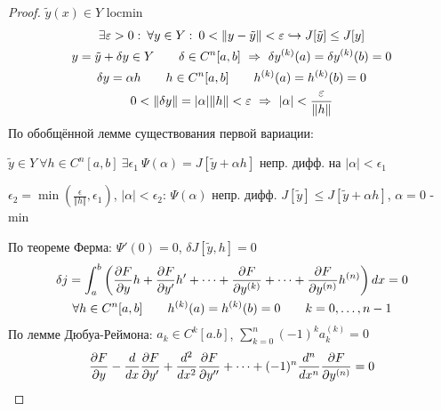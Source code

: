 \documentclass{article}
\begin{document}
\begin{proof}
  $\tilde{y}(x) \in Y$ locmin
  \begin{gather*}
    \exists \epsilon > 0 :\: \forall y \in Y :\: 0 < \Vert y-\tilde{y} \Vert < \epsilon \true J[\tilde{y}] \le J[y] \\ 
    y = \tilde{y} + \delta y \in Y \qquad \delta \in C^{n}[a,b] \ \implies \  \delta y^{(k)}(a)= \delta y^{(k)}(b)=0 \\ 
    \delta y = \alpha h \qquad h \in C^{n}[a,b] \qquad h^{(k)}(a)=h^{(k)}(b)=0 \\ 
    0 < \Vert \delta y \Vert = |\alpha|\Vert h \Vert < \epsilon \ \implies \ |\alpha| < \frac{\epsilon}{\Vert h \Vert}
  \end{gather*}
  По обобщённой лемме существования первой вариации: 

  $\tilde{y}\in Y \ \forall h \in C^{n}[a,b] \ \exists \epsilon_1 \ \Psi(\alpha)=J[\tilde{y}+\alpha h]$
  непр. дифф. на $|\alpha| < \epsilon_1$

  $\epsilon_2 = \min(\frac{\epsilon}{\Vert h \Vert}, \epsilon_1)$, $|\alpha| < \epsilon_2$:
  $\Psi(\alpha)$ непр. дифф. $J[\tilde{y}] \le J[\tilde{y}+\alpha h]$, $\alpha=0$ - min

  По теореме Ферма: $\Psi'(0)=0$, $\delta J[\tilde{y}, h]=0$
  \begin{gather*}
    \delta j = \int_{a}^{b}\left(\frac{\partial{F}}{\partial{y}}h + \frac{\partial{F}}{\partial{y'}}h' + \dots + \frac{\partial{F}}{\partial{y^{(k)}}} + \dots + \frac{\partial{F}}{\partial{y^{(n)}}}h^{(n)}\right)dx=0 \\ 
    \forall h \in C^{n}[a,b] \qquad h^{(k)}(a)=h^{(k)}(b)=0 \qquad k=0,\dots ,n-1
  \end{gather*}
  По лемме Дюбуа-Реймона: $a_k \in C^{k}[a.b]$, $\sum_{k=0}^{n}(-1)^{k}a_k^{(k)}=0$
  \begin{gather*}
    \frac{\partial{F}}{\partial{y}}-\frac{d}{dx}\frac{\partial{F}}{\partial{y'}}+\frac{d^{2}}{dx^{2}}\frac{\partial{F}}{\partial{y''}}+\dots +(-1)^{n}\frac{d^{n}}{dx^{n}}\frac{\partial{F}}{\partial{y^{(n)}}}=0
  \end{gather*}
\end{proof}
\end{document}
